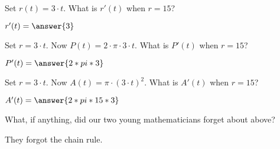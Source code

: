 \documentclass{ximera}
\begin{document}
\begin{problem}
  Set $r(t)=3\cdot t$. What is $r'(t)$ when $r=15$?
  \begin{prompt}
    $r'(t)=\answer{3}$
  \end{prompt}
\end{problem}

\begin{problem}
  Set $r=3\cdot t$. Now $P(t) = 2\cdot \pi\cdot 3\cdot t$. What is
  $P'(t)$ when $r=15$?
  \begin{prompt}
    $P'(t)=\answer{2*pi*3}$
  \end{prompt}
\end{problem}

\begin{problem}
  Set $r=3\cdot t$. Now $A(t) = \pi\cdot (3\cdot t)^2$. What is
  $A'(t)$ when $r=15$?
  \begin{prompt}
    $A'(t)=\answer{2*pi*15*3}$
  \end{prompt}
\end{problem}

\begin{problem}
  What, if anything, did our two young mathematicians forget about above?
  \begin{freeResponse}
 They forgot the chain rule.
  \end{freeResponse}
\end{problem}


\end{document}
